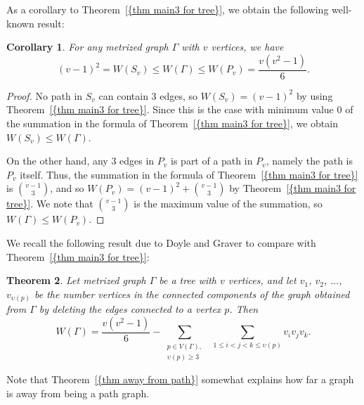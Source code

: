 \documentclass[12pt]{amsart}
\newtheorem{theorem}{Theorem}[section]
\newtheorem{corollary}[theorem]{Corollary}
\theoremstyle{example}
\theoremstyle{definition}
\theoremstyle{notation}
\begin{document}
As a corollary to {Theorem~\ref{{thm main3 for tree}}}, we obtain the following well-known result:
\begin{corollary}\label{cor wiener upper and lower}
For any metrized graph ${\Gamma}$ with $v$ vertices, we have
$$(v-1)^2 = W(S_v) \leq W({\Gamma}) \leq W(P_v)=\frac{v(v^2-1)}{6}.$$
\end{corollary}
\begin{proof}
No path in $S_v$ can contain $3$ edges, so $W(S_v)=(v-1)^2$ by using {Theorem~\ref{{thm main3 for tree}}}. Since this is the case with minimum value $0$ of the summation in the formula of {Theorem~\ref{{thm main3 for tree}}}, we obtain $W(S_v) \leq W({\Gamma})$.

On the other hand, any $3$ edges in $P_v$ is part of a path in $P_v$, namely the path is $P_v$ itself. Thus, the summation in the formula of {Theorem~\ref{{thm main3 for tree}}} is $\binom{v-1}{3}$, and so $W(P_v)=(v-1)^2+\binom{v-1}{3}$ by {Theorem~\ref{{thm main3 for tree}}}. We note that $\binom{v-1}{3}$ is the maximum value of the summation, so $W({\Gamma}) \leq W(P_v)$.
\end{proof}

We recall the following result due to Doyle and Graver \cite{DG} to compare with {Theorem~\ref{{thm main3 for tree}}}:
\begin{theorem}\cite[Theorem 9]{DEG} \label{thm away from path}
Let metrized graph ${\Gamma}$ be a tree with $v$ vertices, and let $v_1$, $v_2$, $\dots$, $v_{{\upsilon}(p)}$ be the number vertices in the connected components of the graph obtained from ${\Gamma}$ by deleting the edges connected to a vertex $p$. Then
$$W({\Gamma})=\frac{v(v^2-1)}{6}- \sum_{\substack{ p \in {V({\Gamma})}, \\  {\upsilon}(p) \geq 3 }} \, \, \, \sum_{1 \leq i < j < k \leq {\upsilon}(p)} v_i v_j v_k.$$
\end{theorem}
Note that {Theorem~\ref{{thm away from path}}} somewhat explains how far a graph is away from being a path graph.
\end{document}
